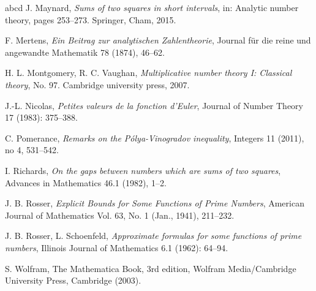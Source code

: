 \documentclass[a4paper]{amsart}
\newcommand{\1}{\mathbbm{1}}
\begin{document}
\begin{thebibliography}{abcd}
 J. Maynard, {\it Sums of two squares in short intervals}, in: Analytic number theory, pages 253--273. Springer, Cham, 2015.

 F. Mertens, {\it Ein Beitrag zur analytischen Zahlentheorie}, Journal für die reine und angewandte Mathematik 78 (1874), 46--62.

 H. L. Montgomery, R. C. Vaughan, \emph{Multiplicative number theory I: Classical theory}, No. 97. Cambridge university press, 2007.

 J.-L. Nicolas, {\it Petites valeurs de la fonction d’Euler}, Journal of Number Theory 17 (1983): 375--388.

 C. Pomerance, {\it Remarks on the Pólya-Vinogradov inequality}, Integers 11 (2011), no 4, 531--542.

 I. Richards, \emph{On the gaps between numbers which are sums of two squares}, Advances in Mathematics 46.1 (1982), 1--2.

 J. B. Rosser, \emph{Explicit Bounds for Some Functions of Prime Numbers}, American Journal of Mathematics
Vol. 63, No. 1 (Jan., 1941), 211--232.

 J. B. Rosser, L. Schoenfeld, \emph{Approximate formulas for some functions of prime numbers}, Illinois Journal of Mathematics 6.1 (1962): 64--94.

 S. Wolfram, The Mathematica Book, 3rd edition, Wolfram Media/Cambridge University Press, Cambridge (2003).

\end{thebibliography}
\end{document}
